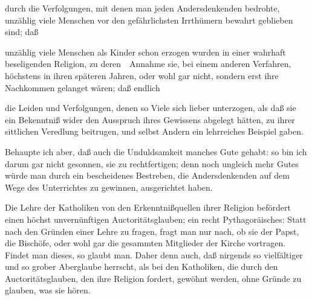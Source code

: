 \begin{aufzb}
\item durch die Verfolgungen, mit denen man jeden Andersdenkenden bedrohte, unzählig viele Menschen vor den gefährlichsten Irrthümern bewahrt geblieben sind; daß
\item unzählig viele Menschen als Kinder schon erzogen wurden in einer wahrhaft beseligenden Religion, zu deren~\ Annahme sie, bei einem anderen Verfahren, höchstens in ihren späteren Jahren, oder wohl gar nicht, sondern erst ihre Nachkommen gelanget wären; daß endlich
\item die Leiden und Verfolgungen, denen so Viele sich lieber unterzogen, als daß sie ein Bekenntniß wider den Ausspruch ihres Gewissens abgelegt hätten, zu ihrer sittlichen Veredlung beitrugen, und selbst Andern ein lehrreiches Beispiel gaben.
\end{aufzb}
Behaupte ich aber, daß auch die Unduldsamkeit manches Gute gehabt: so bin ich darum gar nicht gesonnen, sie zu rechtfertigen; denn noch ungleich mehr Gutes würde man durch ein bescheidenes Bestreben, die Andersdenkenden auf dem Wege des Unterrichtes zu gewinnen, ausgerichtet haben.\par
{} Die Lehre der Katholiken von den Erkenntnißquellen ihrer Religion befördert einen höchst unvernünftigen Auctoritätsglauben; ein recht Pythagoräisches:  Statt nach den Gründen einer Lehre zu fragen, fragt man nur nach, ob sie der Papst, die Bischöfe, oder wohl gar die gesammten Mitglieder der Kirche vortragen. Findet man dieses, so glaubt man. Daher denn auch, daß nirgends so vielfältiger und so grober Aberglaube herrscht, als bei den Katholiken, die durch den Auctoritätsglauben, den ihre Religion fordert, gewöhnt werden, ohne Gründe zu glauben, was sie hören.\par
